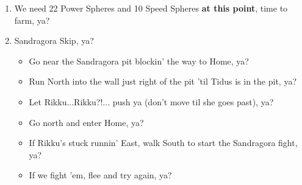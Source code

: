 \begin{enumerate}[resume]
    \item We need 22 Power Spheres and 10 Speed Spheres \textbf{at this point}, time to farm, ya?
    \item Sandragora Skip, ya?
    \begin{itemize}
        \item Go near the Sandragora pit blockin' the way to Home, ya?
        \item Run North into the wall just right of the pit 'til Tidus is in the pit, ya?
        \item Let Rikku...Rikku?!... push ya (don't move til she goes past), ya?
        \item Go north and enter Home, ya?
        \item If Rikku's stuck runnin' East, walk South to start the Sandragora fight, ya?
        \item If we fight 'em, flee and try again, ya?
    \end{itemize}
\end{enumerate}
\bothcb\winnpsingle\lossnpsingle